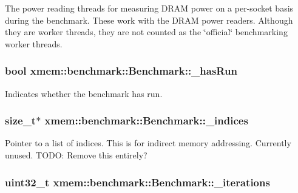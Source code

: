 The power reading threads for measuring D\-R\-A\-M power on a per-\/socket basis during the benchmark. These work with the D\-R\-A\-M power readers. Although they are worker threads, they are not counted as the \char`\"{}official\char`\"{} benchmarking worker threads. \hypertarget{classxmem_1_1benchmark_1_1_benchmark_a7caa584aa404d7751b781fd16c111fd0}{
\subsubsection[{\-\_\-has\-Run}]{\setlength{\rightskip}{0pt plus 5cm}bool xmem\-::benchmark\-::\-Benchmark\-::\-\_\-has\-Run\hspace{0.3cm}{\ttfamily [protected]}}}\label{classxmem_1_1benchmark_1_1_benchmark_a7caa584aa404d7751b781fd16c111fd0}
Indicates whether the benchmark has run. \hypertarget{classxmem_1_1benchmark_1_1_benchmark_a1001cb321d8d655a71d435f5a06fdd3a}{
\subsubsection[{\-\_\-indices}]{\setlength{\rightskip}{0pt plus 5cm}size\-\_\-t$\ast$ xmem\-::benchmark\-::\-Benchmark\-::\-\_\-indices\hspace{0.3cm}{\ttfamily [protected]}}}\label{classxmem_1_1benchmark_1_1_benchmark_a1001cb321d8d655a71d435f5a06fdd3a}
Pointer to a list of indices. This is for indirect memory addressing. Currently unused. T\-O\-D\-O\-: Remove this entirely? \hypertarget{classxmem_1_1benchmark_1_1_benchmark_a968403a473a3a4f713f4e73aa0757727}{
\subsubsection[{\-\_\-iterations}]{\setlength{\rightskip}{0pt plus 5cm}uint32\-\_\-t xmem\-::benchmark\-::\-Benchmark\-::\-\_\-iterations\hspace{0.3cm}{\ttfamily [protected]}}}\label{classxmem_1_1benchmark_1_1_benchmark_a968403a473a3a4f713f4e73aa0757727}
